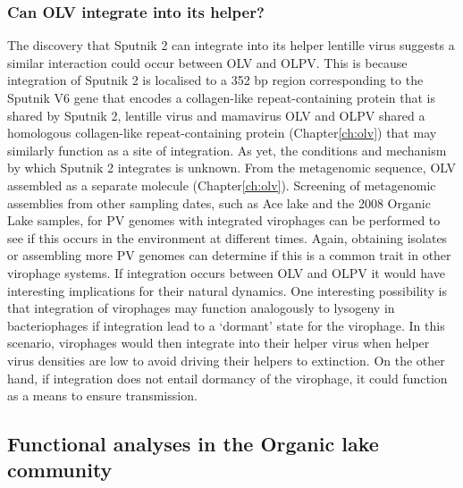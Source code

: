 \subsubsection{Can \ac{OLV} integrate into its helper?} 
The discovery that Sputnik 2 can integrate into its helper lentille virus suggests a similar interaction could occur between \ac{OLV} and \ac{OLPV}.
This is because integration of Sputnik 2 is localised to a 352 bp region corresponding to the Sputnik V6 gene that encodes a collagen-like repeat-containing protein that is shared by Sputnik 2, lentille virus and mamavirus  \cite{Desnues2012} 
\ac{OLV} and \ac{OLPV} shared a homologous collagen-like repeat-containing protein (Chapter\ref{ch:olv}) that may similarly function as a site of integration.
As yet, the conditions and mechanism by which Sputnik 2 integrates is unknown.
From the metagenomic sequence, \ac{OLV} assembled as a separate molecule (Chapter\ref{ch:olv}).
Screening of metagenomic assemblies from other sampling dates, such as Ace lake and the 2008 Organic Lake samples, for \ac{PV} genomes with integrated virophages can be performed to see if this occurs in the environment at different times.
Again, obtaining isolates or assembling more \ac{PV} genomes can determine if this is a common trait in other virophage systems.
If integration occurs between \ac{OLV} and \ac{OLPV} it would have interesting implications for their natural dynamics.
One interesting possibility is that integration of virophages may function analogously to lysogeny in bacteriophages if integration lead to a `dormant' state for the virophage.
In this scenario, virophages would then integrate into their helper virus when helper virus densities are low to avoid driving their helpers to extinction.
On the other hand, if integration does not entail dormancy of the virophage, it could function as a means to ensure transmission.



\subsection{Functional analyses in the Organic lake community}




